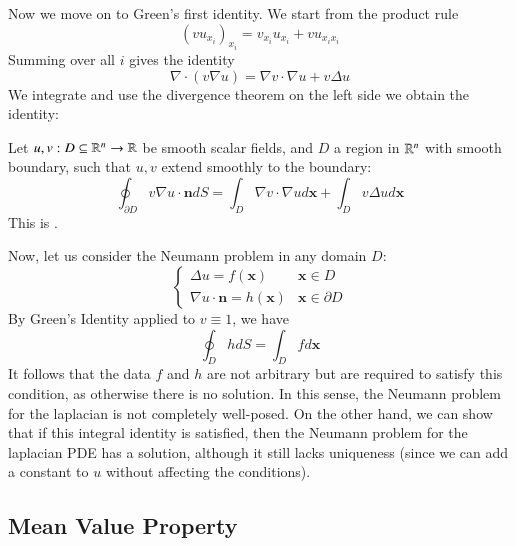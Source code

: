 \documentclass[12pt, a4paper, oneside, openright, titlepage]{book}
\begin{document}
Now we move on to Green's first identity. We start from the product rule \begin{equation*}
    (vu_{x_i})_{x_i} = v_{x_i}u_{x_i}+vu_{x_ix_i}
\end{equation*}
Summing over all $i$ gives the identity \begin{equation*}
    \nabla \cdot (v\nabla u) = \nabla v\cdot \nabla u + v\Delta u
\end{equation*}
We integrate and use the divergence theorem on the left side we obtain the identity:
\begin{defn}
    Let $u,v:D\subseteq \mathbb R^n\rightarrow \mathbb R$ be smooth scalar fields, and $D$ a region in $\mathbb R^n$ with smooth boundary, such that $u,v$ extend smoothly to the boundary:
    \begin{equation}
        \boxed{\oint_{\partial D}v\nabla u\cdot \mathbf{n}dS = \int_D\nabla v\cdot \nabla ud\mathbf{x}+\int_Dv\Delta ud\mathbf{x}}
    \end{equation}
    This is .
\end{defn}

Now, let us consider the Neumann problem in any domain $D$: \begin{equation*}
    \left\{\begin{array}{lc} \Delta u = f(\mathbf{x})& \mathbf{x} \in D \\ \nabla u \cdot \mathbf{n} = h(\mathbf{x}) & \mathbf{x} \in \partial D\end{array}\right.
\end{equation*}
By Green's Identity applied to $v \equiv 1$, we have \begin{equation*}
    \oint_DhdS = \int_Dfd\mathbf{x}
\end{equation*}
It follows that the data $f$ and $h$ are not arbitrary but are required to satisfy this condition, as otherwise there is no solution. In this sense, the Neumann problem for the laplacian is not completely well-posed. On the other hand, we can show that if this integral identity is satisfied, then the Neumann problem for the laplacian PDE has a solution, although it still lacks uniqueness (since we can add a constant to $u$ without affecting the conditions).

\subsection{Mean Value Property}
\end{document}
